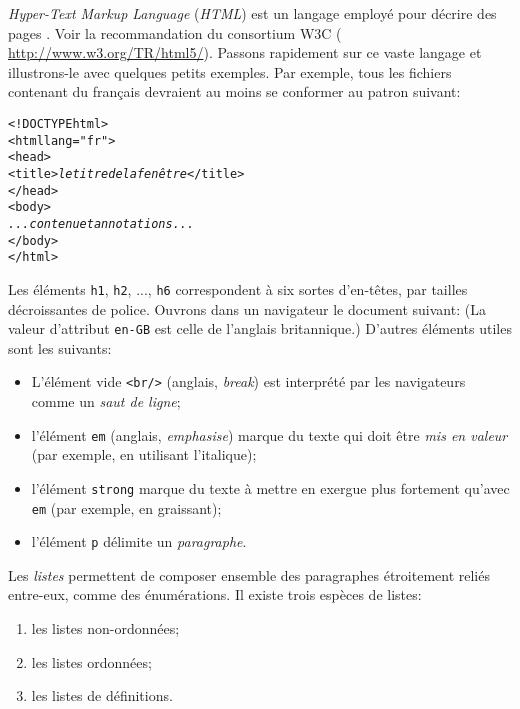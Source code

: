 \emph{Hyper-Text Markup Language} (\emph{\textsf{HTML}}) est un
langage employé pour décrire des pages \HTML. Voir la recommandation
du consortium W3C ({\small
  \url{http://www.w3.org/TR/html5/}}). Passons rapidement sur ce vaste
langage et illustrons-le avec quelques petits exemples. Par exemple,
tous les fichiers \HTML contenant du français devraient au moins se
conformer au patron suivant:
\begin{alltt}
\small<!DOCTYPE html>
<html lang="fr">
  <head>
    <title>\textit{le titre de la fenêtre}</title>
  </head>
  <body>
     \emph{...contenu et annotations...}
  </body>
</html>
\end{alltt}
Les éléments \texttt{h1}, \texttt{h2}, ..., \texttt{h6} correspondent
à six sortes d'en-têtes, par tailles décroissantes de police. Ouvrons
dans un navigateur le document suivant: 
\noindent (La valeur d'attribut \texttt{en-GB} est celle de l'anglais
britannique.) D'autres éléments utiles sont les suivants:
\begin{itemize}

  \item L'élément vide \texttt{<br/>} (anglais, \emph{break}) est
  interprété par les navigateurs comme un \emph{saut de ligne};

  \item l'élément \texttt{em} (anglais, \emph{emphasise}) marque du
  texte qui doit être \emph{mis en valeur} (par exemple, en utilisant
  l'italique);

  \item l'élément \texttt{strong} marque du texte à mettre en exergue
    plus fortement qu'avec \texttt{em} (par exemple, en graissant);

  \item l'élément \texttt{p} délimite un \emph{paragraphe}.

\end{itemize}
Les \emph{listes} permettent de composer ensemble des paragraphes
étroitement reliés entre-eux, comme des énumérations. Il existe trois
espèces de listes:
\begin{enumerate}

  \item les listes non-ordonnées;

  \item les listes ordonnées;

  \item les listes de définitions.

\end{enumerate}
